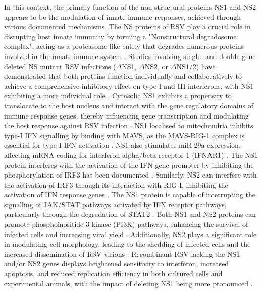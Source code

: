 In this context, the primary function of the non-structural proteins NS1 and NS2 appears to be the modulation of innate immune responses, achieved through various documented mechanisms. The NS proteins of RSV play a crucial role in disrupting host innate immunity by forming a "Nonstructural degradosome complex", acting as a proteasome-like entity that degrades numerous proteins involved in the innate immune system \cite{Boyoglu-Barnum2019BiologyDevelopment.}. Studies involving single- and double-gene-deleted NS mutant RSV infections (\(\Delta\)NS1, \(\Delta\)NS2, or \(\Delta\)NS1/2) have demonstrated that both proteins function individually and collaboratively to achieve a comprehensive inhibitory effect on type I and III interferons, with NS1 exhibiting a more individual role \cite{Sedeyn2019RespiratoryResponses, Spann2004SuppressionMacrophages}. Cytosolic NS1 exhibits a propensity to translocate to the host nucleus and interact with the gene regulatory domains of immune response genes, thereby influencing gene transcription and modulating the host response against RSV infection \cite{Pei2021Nuclear-localizedTranscription}. NS1 localised to mitochondria inhibits type-I IFN signalling by binding with MAVS, as the MAVS-RIG-1 complex is essential for type-I IFN activation \cite{Boyapalle2012RespiratoryInfection}. NS1 also stimulates miR-29a expression, affecting mRNA coding for interferon alpha/beta receptor 1 (IFNAR1) \cite{Sedeyn2019RespiratoryResponses, Zhang2016RespiratoryReceptor}. The NS1 protein interferes with the activation of the IFN gene promoter by inhibiting the phosphorylation of IRF3 has been documented \cite{Spann2005EffectsCytokines}. Similarly, NS2 can interfere with the activation of IRF3 through its interaction with RIG-I, inhibiting the activation of IFN response genes \cite{Wright2006TheHumans}. The NS1 protein is capable of interrupting the signalling of JAK/STAT pathways activated by IFN receptor pathways, particularly through the degradation of STAT2 \cite{Wright2006TheHumans, Sedeyn2019RespiratoryResponses}. Both NS1 and NS2 proteins can promote phosphoinositide 3-kinase (PI3K) pathways, enhancing the survival of infected cells and increasing viral yield \cite{Wu2012TheBiology.}. Additionally, NS2 plays a significant role in modulating cell morphology, leading to the shedding of infected cells and the increased dissemination of RSV virions \cite{Sedeyn2019RespiratoryResponses, Liesman2014RSV-encodedObstruction}. Recombinant RSV lacking the NS1 and/or NS2 genes displays heightened sensitivity to interferon, increased apoptosis, and reduced replication efficiency in both cultured cells and experimental animals, with the impact of deleting NS1 being more pronounced \cite{Whitehead1999RecombinantChimpanzees, Teng2000RecombinantChimpanzees}.

